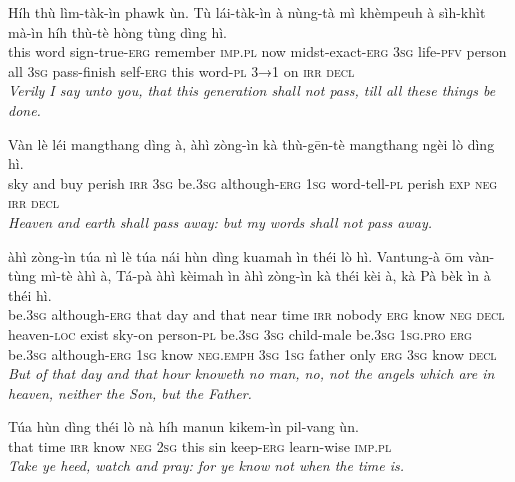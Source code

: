\documentclass[11pt,a4paper]{article}
\begin{document}
\begin{exe}
\gll Híh thù lìm-tàk-ìn phawk ùn. Tù lái-tàk-ìn à nùng-tà mì khèmpeuh à sìh-khìt mà-ìn híh thù-tè hòng tùng dìng hì. \\
     this word sign-true-\textsc{erg} remember \textsc{imp}.\textsc{pl} now midst-exact-\textsc{erg} \textsc{3sg} life-\textsc{pfv} person all \textsc{3sg} pass-finish self-\textsc{erg} this word-\textsc{pl} \textsc{3→1} on \textsc{irr} \textsc{decl} \\
\glt \textcolor{kjvcolor}{\textit{Verily I say unto you, that this generation shall not pass, till all these things be done.}}

\gll Vàn lè léi mangthang dìng à, àhì zòng-ìn kà thù-gēn-tè mangthang ngèi lò dìng hì. \\
     sky and buy perish \textsc{irr} \textsc{3sg} be.\textsc{3sg} although-\textsc{erg} \textsc{1sg} word-tell-\textsc{pl} perish \textsc{exp} \textsc{neg} \textsc{irr} \textsc{decl} \\
\glt \textcolor{kjvcolor}{\textit{Heaven and earth shall pass away: but my words shall not pass away.}}

\gll àhì zòng-ìn túa nì lè túa nái hùn dìng kuamah ìn théi lò hì. Vantung-à ōm vàn-tùng mì-tè àhì à, Tá-pà àhì kèimah ìn àhì zòng-ìn kà théi kèi à, kà Pà bèk ìn à théi hì. \\
     be.\textsc{3sg} although-\textsc{erg} that day and that near time \textsc{irr} nobody \textsc{erg} know \textsc{neg} \textsc{decl} heaven-\textsc{loc} exist sky-on person-\textsc{pl} be.\textsc{3sg} \textsc{3sg} child-male be.\textsc{3sg} \textsc{1sg}.\textsc{pro} \textsc{erg} be.\textsc{3sg} although-\textsc{erg} \textsc{1sg} know \textsc{neg}.\textsc{emph} \textsc{3sg} \textsc{1sg} father only \textsc{erg} \textsc{3sg} know \textsc{decl} \\
\glt \textcolor{kjvcolor}{\textit{But of that day and that hour knoweth no man, no, not the angels which are in heaven, neither the Son, but the Father.}}

\gll Túa hùn dìng théi lò nà híh manun kikem-ìn pil-vang ùn. \\
     that time \textsc{irr} know \textsc{neg} \textsc{2sg} this sin keep-\textsc{erg} learn-wise \textsc{imp}.\textsc{pl} \\
\glt \textcolor{kjvcolor}{\textit{Take ye heed, watch and pray: for ye know not when the time is.}}


\end{exe}
\end{document}

